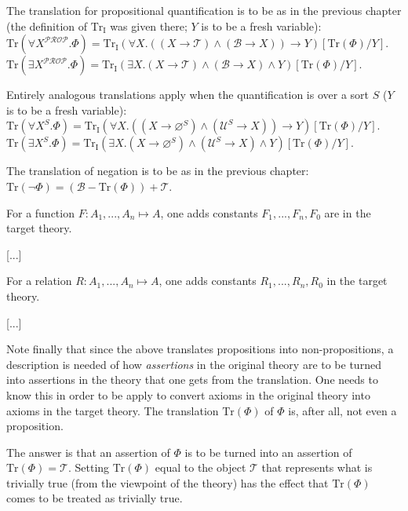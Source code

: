 \documentclass[12pt]{book}
\begin{document}
The translation for propositional quantification is to be as in the previous chapter (the definition of $\mathrm{Tr_I}$ was given there; $Y$ is to be a fresh variable):\\
\indent * $\mathrm{Tr}(\forall X^{\mathcal{PROP}}.\Phi) = \mathrm{Tr_I}(\forall X.((X \rightarrow \mathcal{T}) \wedge (\mathcal{B} \rightarrow X)) \rightarrow Y) [\mathrm{Tr}(\Phi) / Y]$.\\
\indent * $\mathrm{Tr}(\exists X^{\mathcal{PROP}}.\Phi) = \mathrm{Tr_I}(\exists X.(X \rightarrow \mathcal{T}) \wedge (\mathcal{B} \rightarrow X) \wedge Y) [\mathrm{Tr}(\Phi) / Y]$.

Entirely analogous translations apply when the quantification is over a sort $S$ ($Y$ is to be a fresh variable):\\
\indent * $\mathrm{Tr}(\forall X^S.\Phi) = \mathrm{Tr_I}(\forall X.((X \rightarrow \varnothing^S) \wedge (\mathcal{U}^S \rightarrow X)) \rightarrow Y) [\mathrm{Tr}(\Phi) / Y]$.\\
\indent * $\mathrm{Tr}(\exists X^S.\Phi) = \mathrm{Tr_I}(\exists X.(X \rightarrow \varnothing^S) \wedge (\mathcal{U}^S \rightarrow X) \wedge Y) [\mathrm{Tr}(\Phi) / Y]$.

The translation of negation is to be as in the previous chapter:\\
\indent * $\mathrm{Tr}(\neg \Phi) = (\mathcal{B} - \mathrm{Tr}(\Phi)) + \mathcal{T}$.

For a function $F: A_1, ..., A_n \mapsto A$, one adds constants $F_1, ..., F_n, F_0$ are in the target theory.

[...]

For a relation $R: A_1, ..., A_n \mapsto A$, one adds constants $R_1, ..., R_n, R_0$ in the target theory.

[...]

Note finally that since the above translates propositions into non-propositions, a description is needed of how \textit{assertions} in the original theory are to be turned into assertions in the theory that one gets from the translation. One needs to know this in order to be apply to convert axioms in the original theory into axioms in the target theory. The translation $\mathrm{Tr}(\Phi)$ of $\Phi$ is, after all, not even a proposition.

The answer is that an assertion of $\Phi$ is to be turned into an assertion of $\mathrm{Tr}(\Phi) = \mathcal{T}$. Setting $\mathrm{Tr}(\Phi)$ equal to the object $\mathcal{T}$ that represents what is trivially true (from the viewpoint of the theory) has the effect that $\mathrm{Tr}(\Phi)$ comes to be treated as trivially true.
\end{document}

